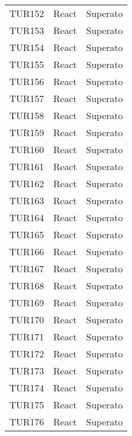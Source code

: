 \documentclass[PianoDiQualifica.tex]{subfiles}
\begin{document}
\begin{longtable}[H]{P{2cm}P{8.5cm}P{3cm}}
	TUR152 & React & Superato \\ 
	TUR153 & React & Superato \\ 
	TUR154 & React & Superato \\ 
	TUR155 & React & Superato \\ 
	TUR156 & React & Superato \\ 
	TUR157 & React & Superato \\ 
	TUR158 & React & Superato \\ 
	TUR159 & React & Superato \\ 
	TUR160 & React & Superato \\ 
	TUR161 & React & Superato \\ 
	TUR162 & React & Superato \\ 
	TUR163 & React & Superato \\ 
	TUR164 & React & Superato \\ 
	TUR165 & React & Superato \\ 
	TUR166 & React & Superato \\ 
	TUR167 & React & Superato \\ 
	TUR168 & React & Superato \\ 
	TUR169 & React & Superato \\ 
	TUR170 & React & Superato \\ 
	TUR171 & React & Superato \\ 
	TUR172 & React & Superato \\ 
	TUR173 & React & Superato \\ 
	TUR174 & React & Superato \\ 
	TUR175 & React & Superato \\ 
	TUR176 & React & Superato \\


\end{longtable}
\end{document}
